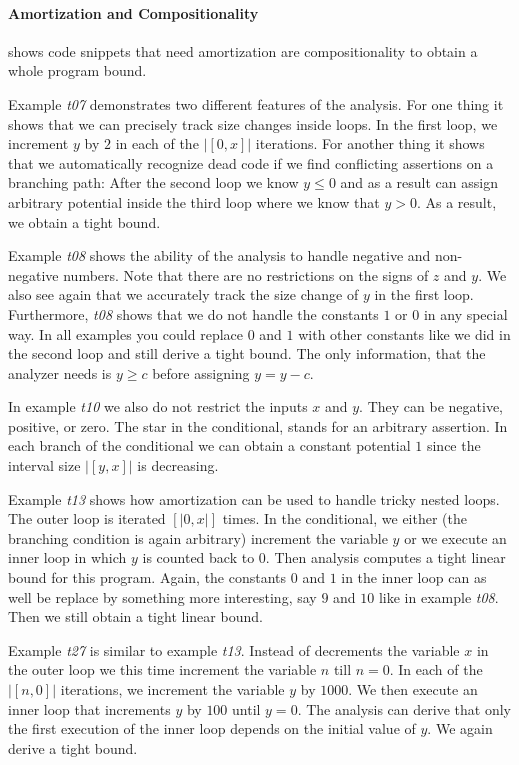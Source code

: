 \documentclass[nocopyrightspace,preprint]{sigplanconf}
\newcommand{\pref}[1]{\prettyref{#1}}
\begin{document}
\paragraph{Amortization and Compositionality}

\pref{fig:cat1} shows code snippets that need amortization are
compositionality to obtain a whole program bound.  

Example \emph{t07} demonstrates two different features of the
analysis.  For one thing it shows that we can precisely track size
changes inside loops.  In the first loop, we increment $y$ by $2$ in
each of the $|[0,x]|$ iterations.  For another thing it shows that we
automatically recognize dead code if we find conflicting assertions on
a branching path: After the second loop we know $y \leq 0$ and as a
result can assign arbitrary potential inside the third loop where we
know that $y>0$.  As a result, we obtain a tight bound.

Example \emph{t08} shows the ability of the analysis to handle
negative and non-negative numbers.  Note that there are no
restrictions on the signs of $z$ and $y$.  We also see again that we
accurately track the size change of $y$ in the first loop.
Furthermore, \emph{t08} shows that we do not handle the constants $1$
or $0$ in any special way.  In all examples you could replace $0$ and
$1$ with other constants like we did in the second loop and still
derive a tight bound.  The only information, that the analyzer needs
is $y \geq c$ before assigning $y = y - c$.

In example \emph{t10} we also do not restrict the inputs $x$ and $y$.
They can be negative, positive, or zero.  The star {\tt *} in the
conditional, stands for an arbitrary assertion.  In each branch of the
conditional we can obtain a constant potential $1$ since the interval
size $|[y,x]|$ is decreasing.

Example \emph{t13} shows how amortization can be used to handle tricky
nested loops.  The outer loop is iterated $[|0,x|]$ times.  In the
conditional, we either (the branching condition is again arbitrary)
increment the variable $y$ or we execute an inner loop in which $y$ is
counted back to $0$.  Then analysis computes a tight linear bound for
this program.  Again, the constants $0$ and $1$ in the inner loop can
as well be replace by something more interesting, say $9$ and $10$
like in example \emph{t08}.  Then we still obtain a tight linear
bound.

Example \emph{t27} is similar to example \emph{t13}.  Instead of
decrements the variable $x$ in the outer loop we this time increment
the variable $n$ till $n = 0$.  In each of the $|[n,0]|$ iterations,
we increment the variable $y$ by $1000$.  We then execute an inner
loop that increments $y$ by $100$ until $y=0$.  The analysis can
derive that only the first execution of the inner loop depends on the
initial value of $y$.  We again derive a tight bound.
\end{document}
